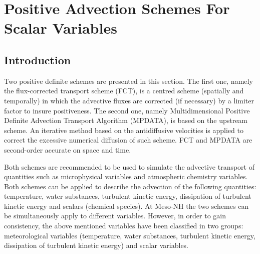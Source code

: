 %
%

\chapter{Positive Advection Schemes For Scalar Variables}
\minitoc

\section{Introduction}

Two positive definite schemes are presented in this section. The first one, namely the
flux-corrected transport scheme (FCT), is a centred scheme (spatially and
temporally) in which
the advective fluxes are corrected (if necessary) by a limiter factor to insure positiveness.
The second one, namely Multidimensional Positive Definite Advection Transport Algorithm
(MPDATA), is based on the upstream scheme. An iterative method based on the antidiffusive
velocities is applied to correct the excessive numerical diffusion of such scheme.
FCT and MPDATA are second-order accurate on space and time.

Both schemes are recommended to be used to simulate the advective transport of
quantities such as
microphysical variables
and atmospheric chemistry variables. Both schemes can be applied to describe
the advection of the following quantities: temperature, water substances,
turbulent kinetic energy, dissipation of turbulent kinetic energy and scalars
(chemical species). At Meso-NH the two schemes can be simultaneously apply to
different variables. However, in order to gain consistency, the above mentioned variables
have been classified in two groups: meteorological variables (temperature, water substances,
turbulent kinetic energy, dissipation of turbulent kinetic energy) and scalar variables.

